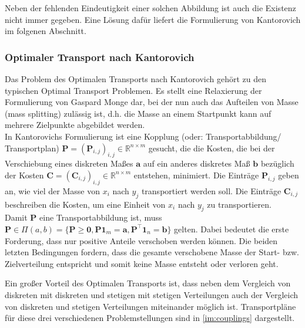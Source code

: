 \documentclass[twoside, 12pt,a4paper]{book}
\numberwithin{equation}{section}
\begin{document}
	\noindent Neben der fehlenden Eindeutigkeit einer solchen Abbildung ist auch die Existenz nicht immer gegeben. Eine Lösung dafür liefert die Formulierung von Kantorovich im folgenen Abschnitt.
	
	\subsubsection{Optimaler Transport nach Kantorovich}
	
	Das Problem des Optimalen Transports nach Kantorovich gehört zu den typischen Optimal Transport Problemen. Es stellt eine Relaxierung der Formulierung von Gaspard Monge dar, bei der nun auch das Aufteilen von Masse (mass splitting) zulässig ist, d.h. die Masse an einem Startpunkt kann auf mehrere Zielpunkte abgebildet werden.\\
	
	\noindent In Kantorovichs Formulierung ist eine Kopplung (oder: Transportabbildung/ Transportplan) $\boldsymbol{P} = (\boldsymbol{P}_{i,j})_{i,j} \in \mathbb{R}^{n\times m}$ gesucht, die die Kosten, die bei der Verschiebung eines diskreten Maßes $\boldsymbol{a}$ auf ein anderes diskretes Maß $\boldsymbol{b}$ bezüglich der Kosten $\boldsymbol{C} = (\boldsymbol{C}_{i,j})_{i,j} \in \mathbb{R}^{n \times m}$ entstehen, minimiert. Die Einträge $\boldsymbol{P}_{i,j}$ geben an, wie viel der Masse von $x_i$ nach $y_j$ transportiert werden soll. Die Einträge $\boldsymbol{C}_{i,j}$ beschreiben die Kosten, um eine Einheit von $x_i$ nach $y_j$ zu transportieren.  \\
	
	\noindent Damit $\boldsymbol{P}$ eine Transportabbildung ist, muss $\boldsymbol{P} \in \Pi(a,b) = \lbrace \boldsymbol{P} \geq \boldsymbol{0}, \boldsymbol{P}\boldsymbol{1}_{m} = \boldsymbol{a}, \boldsymbol{P}^\top\boldsymbol{1}_{n} = \boldsymbol{b} \rbrace$ gelten. Dabei bedeutet die erste Forderung, dass nur positive Anteile verschoben werden können. Die beiden letzten Bedingungen fordern, dass die gesamte verschobene Masse der Start- bzw. Zielverteilung entspricht und somit keine Masse entsteht oder verloren geht.
	
	\noindent Ein großer Vorteil des Optimalen Transports ist, dass neben dem Vergleich von diskreten mit diskreten und stetigen mit stetigen Verteilungen auch der Vergleich von diskreten und stetigen Verteilungen miteinander möglich ist. Transportpläne für diese drei verschiedenen Problemstellungen sind in \autoref{im:couplings} dargestellt.
	
\end{document}
